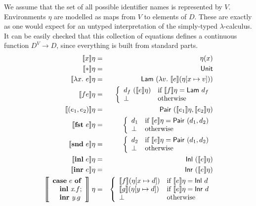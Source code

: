 We assume that the set of all possible identifier names is represented
by $V$. Environments $\eta$ are modelled as maps from $V$ to elements
of $D$. These are exactly as one would expect for an untyped
interpretation of the simply-typed $\lambda$-calculus. It can be
easily checked that this collection of equations defines a continuous
function $D^V \to D$, since everything is built from standard parts.
\begin{eqnarray*}
  \sem{x}\eta & = & \eta(x) \\
  \sem{*}\eta & = & \semCons{Unit} \\
  \sem{\lambda x.\ e}\eta & = & \semCons{Lam}\ (\lambda v.\ \sem{e}(\eta[x \mapsto v])) \\
  \sem{fe}\eta & = & \left\{
    \begin{array}{ll}
      d_f\ (\sem{e}\eta) & \textrm{if}\ \sem{f}\eta = \semCons{Lam}\ d_f \\
      \bot & \textrm{otherwise}
    \end{array}
    \right. \\
  \sem{(e_1,e_2)}\eta & = & \semCons{Pair}\ (\sem{e_1}\eta, \sem{e_2}\eta) \\
  \sem{\kw{fst}\ e}\eta & = & \left\{
    \begin{array}{ll}
      d_1 & \textrm{if}\ \sem{e}\eta = \semCons{Pair}\ (d_1, d_2) \\
      \bot & \textrm{otherwise}
    \end{array}
  \right. \\
  \sem{\kw{snd}\ e}\eta & = & \left\{
    \begin{array}{ll}
      d_2 & \textrm{if}\ \sem{e}\eta = \semCons{Pair}\ (d_1, d_2) \\
      \bot & \textrm{otherwise}
    \end{array}
  \right. \\
  \sem{\kw{inl}\ e}\eta & = & \semCons{Inl}\ (\sem{e}\eta) \\
  \sem{\kw{inr}\ e}\eta & = & \semCons{Inr}\ (\sem{e}\eta) \\
  \left\llbracket
    \begin{array}{l}
      \kw{case}\ e\ \kw{of}\\
      \quad\kw{inl}\ \ident{x}.f;\\
      \quad\kw{inr}\ \ident{y}.g
    \end{array}
  \right\rrbracket\eta & = &
  \left\{
    \begin{array}{ll}
      \sem{f}(\eta[x \mapsto d]) & \textrm{if }\sem{e}\eta = \semCons{Inl}\ d \\
      \sem{g}(\eta[y \mapsto d]) & \textrm{if }\sem{e}\eta = \semCons{Inr}\ d \\
      \bot & \textrm{otherwise}
    \end{array}
  \right. \\
\end{eqnarray*}
